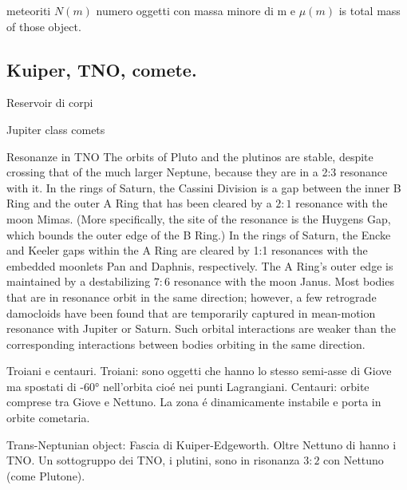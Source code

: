 \begin{wordonframe}{meteoriti}
$N(m)$ numero oggetti con massa minore di m e $\mu(m)$ is total mass of those object.
\end{wordonframe}

\subsection{Kuiper, TNO, comete.}

\begin{frame}{Reservoir di corpi}

\end{frame}

\begin{wordonframe}{Jupiter class comets}

\end{wordonframe}

\begin{frame}{Resonanze in TNO}
The orbits of Pluto and the plutinos are stable, despite crossing that of the much larger Neptune, because they are in a 2:3 resonance with it.
In the rings of Saturn, the Cassini Division is a gap between the inner B Ring and the outer A Ring that has been cleared by a $2:1$ resonance with the moon Mimas. (More specifically, the site of the resonance is the Huygens Gap, which bounds the outer edge of the B Ring.)
    In the rings of Saturn, the Encke and Keeler gaps within the A Ring are cleared by 1:1 resonances with the embedded moonlets Pan and Daphnis, respectively. The A Ring's outer edge is maintained by a destabilizing $7:6$ resonance with the moon Janus.
Most bodies that are in resonance orbit in the same direction; however, a few retrograde damocloids have been found that are temporarily captured in mean-motion resonance with Jupiter or Saturn. Such orbital interactions are weaker than the corresponding interactions between bodies orbiting in the same direction.
\end{frame}

\begin{frame}{Troiani e centauri.}
Troiani: sono oggetti che hanno lo stesso semi-asse di Giove ma spostati di \ang{+-60} nell'orbita cio\'e nei punti Lagrangiani.
Centauri: orbite comprese tra Giove e Nettuno. La zona \'e dinamicamente instabile e porta in orbite cometaria.
\end{frame}

\begin{frame}{Trans-Neptunian object: Fascia di Kuiper-Edgeworth.}
Oltre Nettuno di hanno i TNO.
Un sottogruppo dei TNO, i plutini, sono in risonanza $3:2$ con Nettuno (come Plutone).
\end{frame}

